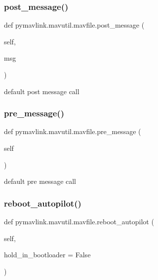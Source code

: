 \subsubsection{\texorpdfstring{post\+\_\+message()}{post\_message()}}
{\footnotesize\ttfamily def pymavlink.\+mavutil.\+mavfile.\+post\+\_\+message (\begin{DoxyParamCaption}\item[{}]{self,  }\item[{}]{msg }\end{DoxyParamCaption})}

\begin{DoxyVerb}default post message call\end{DoxyVerb}
 \mbox{\label{classpymavlink_1_1mavutil_1_1mavfile_ad0ea96f4450b27d0327d9060d55e05be}} 
\subsubsection{\texorpdfstring{pre\+\_\+message()}{pre\_message()}}
{\footnotesize\ttfamily def pymavlink.\+mavutil.\+mavfile.\+pre\+\_\+message (\begin{DoxyParamCaption}\item[{}]{self }\end{DoxyParamCaption})}

\begin{DoxyVerb}default pre message call\end{DoxyVerb}
 \mbox{\label{classpymavlink_1_1mavutil_1_1mavfile_ae1f8a428d88379acbdbdd0bcc0f81106}} 
\subsubsection{\texorpdfstring{reboot\+\_\+autopilot()}{reboot\_autopilot()}}
{\footnotesize\ttfamily def pymavlink.\+mavutil.\+mavfile.\+reboot\+\_\+autopilot (\begin{DoxyParamCaption}\item[{}]{self,  }\item[{}]{hold\+\_\+in\+\_\+bootloader = {\ttfamily False} }\end{DoxyParamCaption})}

